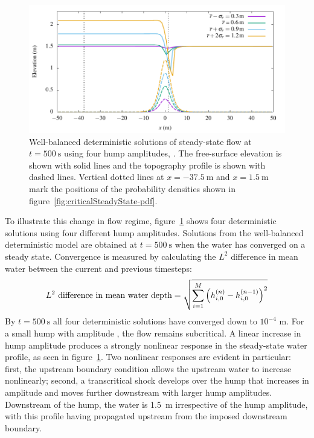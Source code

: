 \begin{figure}
    \centering
    \includegraphics{fig-criticalSteadyState-examples.pdf}
    \caption{Well-balanced deterministic solutions of steady-state flow at $t = \SI{500}{\second}$ using four hump amplitudes, .
    The free-surface elevation is shown with solid lines and the topography profile is shown with dashed lines.
    Vertical dotted lines at $x = \SI{-37.5}{\meter}$ and $x = \SI{1.5}{\meter}$ mark the positions of the probability densities shown in figure~\ref{fig:criticalSteadyState-pdf}.}
    \label{fig:criticalSteadyState-examples}
\end{figure}

To illustrate this change in flow regime, figure~\ref{fig:criticalSteadyState-examples} shows four deterministic solutions using four different hump amplitudes.
Solutions from the well-balanced deterministic model are obtained at $t = \SI{500}{\second}$ when the water has converged on a steady state.
Convergence is measured by calculating the $L^2$ difference in mean water  between the current and previous timesteps:
\begin{align}
    L^2 \text{ difference in mean water depth} = \sqrt{\sum_{i=1}^M \left(h_{i,0}^{(n)} - h_{i,0}^{(n-1)}\right)^2} \label{eqn:convergence}
\end{align}
By $t = \SI{500}{\second}$ all four deterministic solutions have converged down to  $10^{-4}$ \si{\meter}.
For a small hump with amplitude , the flow remains subcritical.
A linear increase in hump amplitude produces a strongly nonlinear response in the steady-state water profile, as seen in figure~\ref{fig:criticalSteadyState-examples}. 
Two nonlinear responses are evident in particular: first, the upstream boundary condition allows the upstream water  to increase nonlinearly; second, a transcritical shock develops over the hump that increases in amplitude and moves further downstream with larger hump amplitudes.
Downstream of the hump, the water  is \SI{1.5}{\meter} irrespective of the hump amplitude, with this profile having propagated upstream from the imposed downstream boundary.

